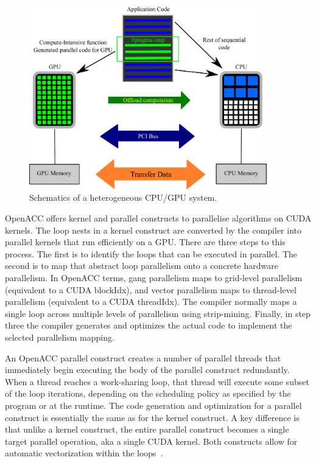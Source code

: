 \begin{figure}[tbhp]
	\centering
	\includegraphics[width=0.92\textwidth]{GPU_Concept}
	\caption{Schematics of a heterogeneous CPU/GPU system.}
	\label{fig:GPUConcept}
\end{figure}

OpenACC offers kernel and parallel constructs to parallelise algorithms on CUDA 
kernels. The loop nests in a kernel construct are converted by the compiler 
into parallel kernels that run efficiently on a GPU. There are three steps to 
this process. The first is to identify the loops that can be executed 
in parallel. The second is to map that abstract loop parallelism onto a 
concrete hardware parallelism. In OpenACC terms, gang parallelism maps to 
grid-level parallelism (equivalent to a CUDA blockIdx), and vector parallelism 
maps to thread-level parallelism (equivalent to a CUDA threadIdx). The compiler 
normally maps a single loop across multiple levels of parallelism using 
strip-mining. Finally, in step three the compiler generates and optimizes the 
actual code to implement the selected parallelism mapping.

An OpenACC parallel construct creates a number of parallel threads that 
immediately begin executing the body of the parallel construct redundantly. 
When a thread reaches a work-sharing loop, that thread will execute some subset 
of the loop iterations, depending on the scheduling policy as specified by the 
program or at the runtime. The code generation and optimization for a parallel 
construct is essentially the same as for the kernel construct. A key 
difference is that unlike a kernel construct, the entire parallel construct 
becomes a single target parallel operation, aka a single CUDA kernel. Both 
constructs allow for automatic vectorization within the loops~\citep{Wolfe2012}.

